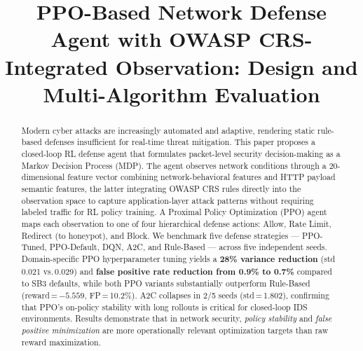 \documentclass[conference]{IEEEtran}
\begin{document}
\title{PPO-Based Network Defense Agent with OWASP CRS-Integrated Observation: Design and Multi-Algorithm Evaluation}

\author{
}

\maketitle

\begin{abstract}
Modern cyber attacks are increasingly automated and adaptive, rendering
static rule-based defenses insufficient for real-time threat mitigation.
This paper proposes a closed-loop RL defense agent that formulates
packet-level security decision-making as a Markov Decision Process (MDP).
The agent observes network conditions through a 20-dimensional feature vector
combining network-behavioral features and HTTP payload semantic features,
the latter integrating OWASP CRS rules directly into the observation space
to capture application-layer attack patterns without requiring labeled traffic
for RL policy training. A Proximal Policy
Optimization (PPO) agent maps each observation to one of four hierarchical
defense actions: Allow, Rate Limit, Redirect (to honeypot), and Block.
We benchmark five defense strategies --- PPO-Tuned, PPO-Default, DQN, A2C,
and Rule-Based --- across five independent seeds. Domain-specific PPO hyperparameter tuning yields a \textbf{28\% variance
reduction} (std\,0.021 vs.\,0.029) and \textbf{false positive rate reduction
from 0.9\% to 0.7\%} compared to SB3 defaults, while both PPO variants
substantially outperform Rule-Based (reward\,=\,$-5.559$, FP\,=\,10.2\%). A2C collapses in 2/5 seeds (std\,=\,1.802), confirming that
PPO's on-policy stability with long rollouts is critical for closed-loop
IDS environments. Results demonstrate that in network security,
\emph{policy stability} and \emph{false positive minimization} are more
operationally relevant optimization targets than raw reward maximization.
\end{abstract}
\end{document}
